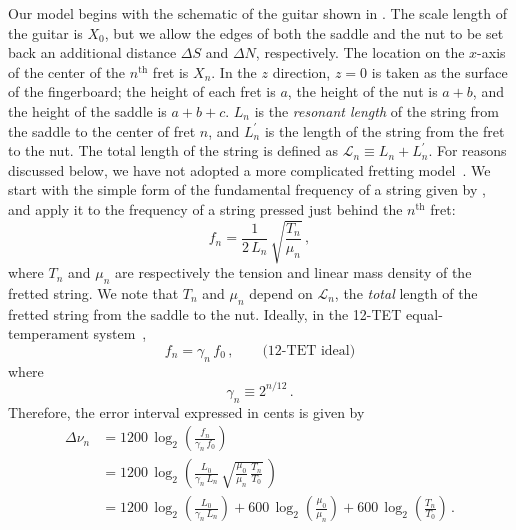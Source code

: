 Our model begins with the schematic of the guitar shown in . The scale length of the guitar is $X_0$, but we allow the edges of both the saddle and the nut to be set back an additional distance $\Delta S$ and $\Delta N$, respectively. The location on the $x$-axis of the center of the $n^\textrm{th}$ fret is $X_n$. In the $z$ direction, $z = 0$ is taken as the surface of the fingerboard; the height of each fret is $a$, the height of the nut is $a + b$, and the height of the saddle is $a + b + c$. $L_n$ is the \emph{resonant length} of the string from the saddle to the center of fret $n$, and $L^\prime_n$ is the length of the string from the fret to the nut. The total length of the string is defined as $\mathcal{L}_n \equiv L_n + L^\prime_n$. For reasons discussed below, we have not adopted a more complicated fretting model~\cite{ref:byers1996cgi,ref:varieschi2010icf}. We start with the simple form of the fundamental frequency of a string given by , and apply it to the frequency of a string pressed just behind the $n^\mathrm{th}$ fret:
 \begin{equation} \label{eqn:f_n_def}
f_n = \frac{1}{2\, L_n}\, \sqrt{\frac{T_n}{\mu_n}}\, ,
 \end{equation}
where $T_n$ and $\mu_n$ are respectively the tension and linear mass density of the fretted string. We note that $T_n$ and $\mu_n$ depend on $\mathcal{L}_n$, the \emph{total} length of the fretted string from the saddle to the nut. Ideally, in the 12-TET equal-temperament system~\cite{ref:durfee2015pms},
 \begin{equation} \label{eqn:f_n_tet}
f_n = \gamma_n\, f_0\, , \qquad \textrm{(12-TET~ideal)}
 \end{equation}
where
 \begin{equation} \label{eqn:gamme_n_def}
\gamma_n \equiv 2^{n / 12}\, .
 \end{equation}
Therefore, the error interval expressed in cents is given by
 \begin{equation}\label{eqn:error_def}
 \begin{split}
\Delta \nu_n &= 1200\, \log_2\left( \frac{f_n}{\gamma_n\, f_0} \right) \\
&= 1200\, \log_2 \left( \frac{L_0}{\gamma_n\, L_n}\, \sqrt{\frac{\mu_0}{\mu_n}\, \frac{T_n}{T_0}}\, \right) \\
&= 1200\, \log_2 \left( \frac{L_0}{\gamma_n\, L_n} \right) + 600\, \log_2 \left(  \frac{\mu_0}{\mu_n} \right) + 600\, \log_2 \left( \frac{T_n}{T_0} \right)\, .
 \end{split}
 \end{equation}

